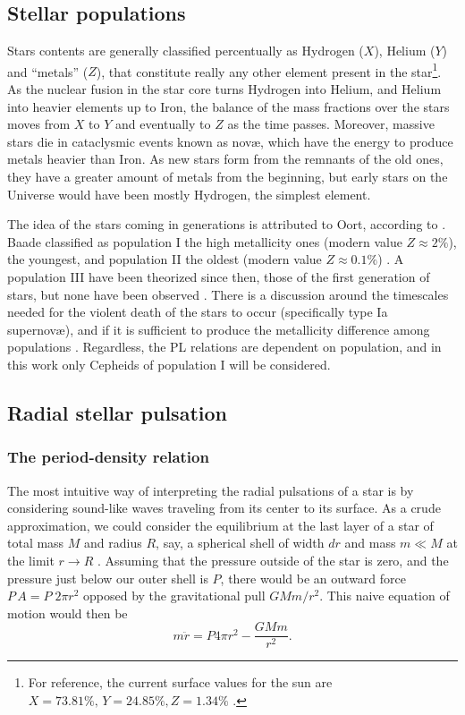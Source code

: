 	\subsection{Stellar populations}
	
	Stars contents are generally classified percentually as Hydrogen ($X$), Helium ($Y$) and \enquote{metals} ($Z$), 
	that constitute really any other element present in the star\footnote{
		For reference, the current surface values for the sun are $X=73.81\%,\,Y=24.85\%,Z=1.34\%$ \citep{Asplund2009}.
	}.
	As the nuclear fusion in the star core turns Hydrogen into Helium, and Helium into heavier elements up to Iron, 
	the balance of the mass fractions over the stars moves from $X$ to $Y$ and eventually to $Z$ as the time passes.
	Moreover, massive stars die in cataclysmic events known as novæ, which have the energy to produce metals heavier than Iron.
	As new stars form from the remnants of the old ones, they have a greater amount of metals from the beginning, 
	but early stars on the Universe would have been mostly Hydrogen, the simplest element.
	
	The idea of the stars coming in generations is attributed to Oort, according to \cite{Baade1944}.
	Baade classified as population I the high metallicity ones (modern value $Z\approx 2\%$), the youngest, 
	and population II the oldest (modern value $Z\approx 0.1\%$) \citep{Carroll2017}. 
	A population III have been theorized since then, those of the first generation of stars, but none have been observed \citep{Heger2002}.
	There is a discussion around the timescales needed for the violent death of the stars to occur (specifically type Ia supernovæ), 
	and if it is sufficient to produce the metallicity difference among populations \citep{Carroll2017}.
	Regardless, the PL relations are dependent on population, and in this work only Cepheids of population I will be considered.
	
	
\subsection{Radial stellar pulsation}
	
	\subsubsection{The period-density relation}

	The most intuitive way of interpreting the radial pulsations of a star 
	is by considering sound-like waves traveling from its center to its surface.
	As a crude approximation, we could consider the equilibrium at the last layer of a star of total mass $M$ and  radius $R$,
	say, a spherical shell of width $dr$ and mass $m\ll M$ at the limit $r\to R$ . 
	Assuming that the pressure outside of the star is zero, and the pressure just below our outer shell is $P$,
	there would be an outward force $P\,A=P\;2\pi r^2$ opposed by the gravitational pull $GMm/r^2$.
	This naive equation of motion would then be
	\begin{equation}
		m \ddot{r} = P 4\pi r^2 - \frac{GMm}{r^2}. \label{eq:period-density-motion}
	\end{equation}
	
